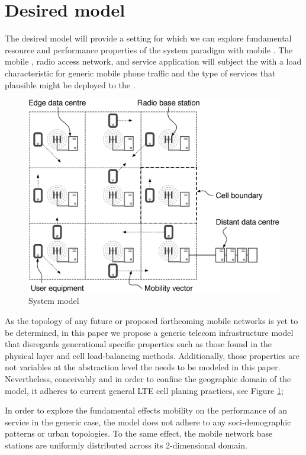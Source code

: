 \section{Desired model}

The desired model will provide a setting for which we can explore fundamental resource and performance properties of the \xcloud{} system paradigm with mobile \ues{}. The mobile \ues{}, radio access network, and service application will subject the \dcs{} with a load characteristic for generic mobile phone traffic and the type of services that plausible might be deployed to the \xcloud{}.

\begin{figure}[tb]
	\centering
	\includegraphics[width=\linewidth]{fig_system_model.eps} 
	\caption{System model}
	\label{fig:system_model}
\end{figure}

As the topology of any future \xcloud{} or proposed forthcoming mobile networks is yet to be determined, in this paper we propose a generic telecom infrastructure model that disregards generational specific properties such as those found in the physical layer and cell load-balancing methods. Additionally, those properties are not variables at the abstraction level the \xcloud needs to be modeled in this paper. Nevertheless, conceivably and in order to confine the geographic domain of the model, it adheres to current general LTE cell planing practices, see Figure \ref{fig:system_model};

In order to explore the fundamental effects mobility on the performance of an \xcloud service in the generic case, the model does not adhere to any soci-demographic patterns or urban topologies. To the same effect, the mobile network base stations are uniformly distributed across its 2-dimensional domain.

